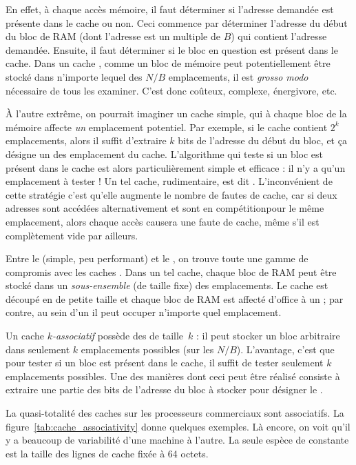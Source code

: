 En effet, à chaque accès mémoire, il faut déterminer si l'adresse demandée est
présente dans le cache ou non. Ceci commence par déterminer l'adresse du début
du bloc de RAM (dont l'adresse est un multiple de $B$) qui contient l'adresse
demandée. Ensuite, il faut déterminer si le bloc en question est présent dans le
cache.  Dans un cache , comme un bloc de mémoire peut
potentiellement être stocké dans n'importe lequel des $N/B$ emplacements, il est
\textit{grosso modo} nécessaire de tous les examiner. C'est donc coûteux,
complexe, énergivore, etc.

À l'autre extrême, on pourrait imaginer un cache simple, qui à chaque bloc de la
mémoire affecte \emph{un} emplacement potentiel. Par exemple, si le cache
contient $2^k$ emplacements, alors il suffit d'extraire $k$ bits de l'adresse du
début du bloc, et ça désigne un des emplacement du cache. L'algorithme qui teste
si un bloc est présent dans le cache est alors particulièrement simple et
efficace : il n'y a qu'un emplacement à tester ! Un tel cache, rudimentaire, est
dit . L'inconvénient de cette stratégie c'est qu'elle
augmente le nombre de fautes de cache, car si deux adresses sont accédées
alternativement et sont \og en compétition\fg pour le même emplacement, alors
chaque accès causera une faute de cache, même s'il est complètement vide par
ailleurs.

Entre le  (simple, peu performant) et le
, on trouve toute une gamme de compromis avec les
caches . Dans un tel cache, chaque bloc de RAM peut
être stocké dans un \emph{sous-ensemble} (de taille fixe) des emplacements. Le
cache est découpé en \og {}\fg de petite taille et chaque bloc de
RAM est affecté d'office à un  ; par contre, au sein d'un
 il peut occuper n'importe quel emplacement.

Un cache \emph{$k$-associatif} possède des  de taille~$k$ : il
peut stocker un bloc arbitraire dans seulement $k$ emplacements possibles (sur
les $N/B$). L'avantage, c'est que pour tester si un bloc est présent dans le
cache, il suffit de tester seulement $k$ emplacements possibles. Une des
manières dont ceci peut être réalisé consiste à extraire une partie des bits de
l'adresse du bloc à stocker pour désigner le .

La quasi-totalité des caches sur les processeurs commerciaux sont
associatifs. La figure~\ref{tab:cache_associativity} donne quelques exemples. Là
encore, on voit qu'il y a beaucoup de variabilité d'une machine à l'autre. La
seule espèce de constante est la taille des lignes de cache fixée à 64 octets.

